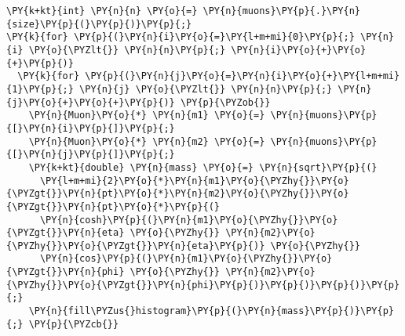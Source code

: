 \begin{Verbatim}[commandchars=\\\{\}]
\PY{k+kt}{int} \PY{n}{n} \PY{o}{=} \PY{n}{muons}\PY{p}{.}\PY{n}{size}\PY{p}{(}\PY{p}{)}\PY{p}{;}
\PY{k}{for} \PY{p}{(}\PY{n}{i}\PY{o}{=}\PY{l+m+mi}{0}\PY{p}{;} \PY{n}{i} \PY{o}{\PYZlt{}} \PY{n}{n}\PY{p}{;} \PY{n}{i}\PY{o}{+}\PY{o}{+}\PY{p}{)}
  \PY{k}{for} \PY{p}{(}\PY{n}{j}\PY{o}{=}\PY{n}{i}\PY{o}{+}\PY{l+m+mi}{1}\PY{p}{;} \PY{n}{j} \PY{o}{\PYZlt{}} \PY{n}{n}\PY{p}{;} \PY{n}{j}\PY{o}{+}\PY{o}{+}\PY{p}{)} \PY{p}{\PYZob{}}
    \PY{n}{Muon}\PY{o}{*} \PY{n}{m1} \PY{o}{=} \PY{n}{muons}\PY{p}{[}\PY{n}{i}\PY{p}{]}\PY{p}{;}
    \PY{n}{Muon}\PY{o}{*} \PY{n}{m2} \PY{o}{=} \PY{n}{muons}\PY{p}{[}\PY{n}{j}\PY{p}{]}\PY{p}{;}
    \PY{k+kt}{double} \PY{n}{mass} \PY{o}{=} \PY{n}{sqrt}\PY{p}{(}
      \PY{l+m+mi}{2}\PY{o}{*}\PY{n}{m1}\PY{o}{\PYZhy{}}\PY{o}{\PYZgt{}}\PY{n}{pt}\PY{o}{*}\PY{n}{m2}\PY{o}{\PYZhy{}}\PY{o}{\PYZgt{}}\PY{n}{pt}\PY{o}{*}\PY{p}{(}
      \PY{n}{cosh}\PY{p}{(}\PY{n}{m1}\PY{o}{\PYZhy{}}\PY{o}{\PYZgt{}}\PY{n}{eta} \PY{o}{\PYZhy{}} \PY{n}{m2}\PY{o}{\PYZhy{}}\PY{o}{\PYZgt{}}\PY{n}{eta}\PY{p}{)} \PY{o}{\PYZhy{}}
      \PY{n}{cos}\PY{p}{(}\PY{n}{m1}\PY{o}{\PYZhy{}}\PY{o}{\PYZgt{}}\PY{n}{phi} \PY{o}{\PYZhy{}} \PY{n}{m2}\PY{o}{\PYZhy{}}\PY{o}{\PYZgt{}}\PY{n}{phi}\PY{p}{)}\PY{p}{)}\PY{p}{)}\PY{p}{;}
    \PY{n}{fill\PYZus{}histogram}\PY{p}{(}\PY{n}{mass}\PY{p}{)}\PY{p}{;} \PY{p}{\PYZcb{}}
\end{Verbatim}
